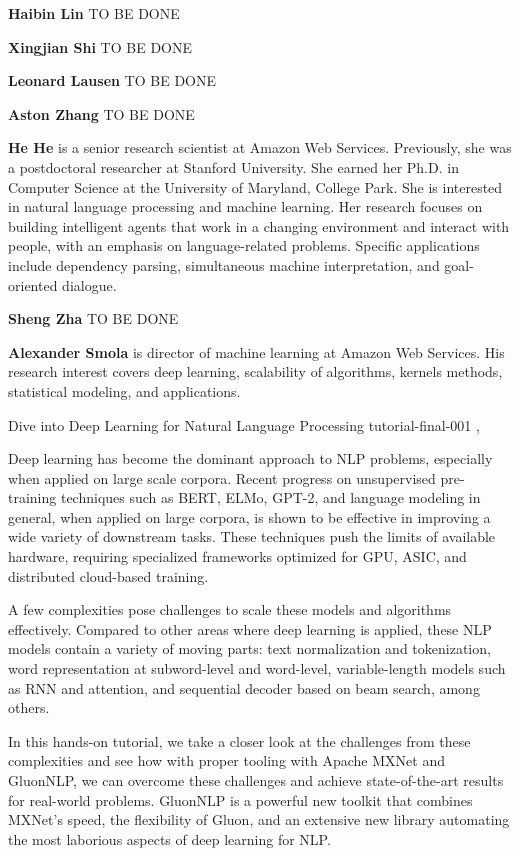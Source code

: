 \begin{bio}

\textbf{Haibin Lin} TO BE DONE

\textbf{Xingjian Shi} TO BE DONE 

\textbf{Leonard Lausen} TO BE DONE 

\textbf{Aston Zhang} TO BE DONE

\textbf{He He} is a senior research scientist at Amazon Web Services. Previously, she was a postdoctoral researcher at Stanford University. She earned her Ph.D. in Computer Science at the University of Maryland, College Park. She is interested in natural language processing and machine learning. Her research focuses on building intelligent agents that work in a changing environment and interact with people, with an emphasis on language-related problems. Specific applications include dependency parsing, simultaneous machine interpretation, and goal-oriented dialogue.


\textbf{Sheng Zha} TO BE DONE

\textbf{Alexander Smola} is director of machine learning at Amazon Web Services. His research interest covers deep learning, scalability of algorithms, kernels methods, statistical modeling, and applications.


\end{bio}

\begin{tutorial}
  {Dive into Deep Learning for Natural Language Processing}
  {tutorial-final-001}
  {\daydateyear, \tutorialfulltime}
  {\TutLocA}

Deep learning has become the dominant approach to NLP problems, especially when applied on large scale corpora. Recent progress on unsupervised pre-training techniques such as BERT, ELMo, GPT-2, and language modeling in general, when applied on large corpora, is shown to be effective in improving a wide variety of downstream tasks. These techniques push the limits of available hardware, requiring specialized frameworks optimized for GPU, ASIC, and distributed cloud-based training.

A few complexities pose challenges to scale these models and algorithms effectively. Compared to other areas where deep learning is applied, these NLP models contain a variety of moving parts: text normalization and tokenization, word representation at subword-level and word-level, variable-length models such as RNN and attention, and sequential decoder based on beam search, among others.

In this hands-on tutorial, we take a closer look at the challenges from these complexities and see how with proper tooling with Apache MXNet and GluonNLP, we can overcome these challenges and achieve state-of-the-art results for real-world problems. GluonNLP is a powerful new toolkit that combines MXNet’s speed, the flexibility of Gluon, and an extensive new library automating the most laborious aspects of deep learning for NLP.

\end{tutorial}
